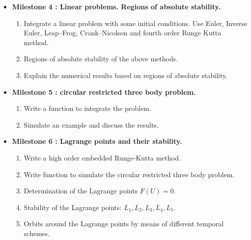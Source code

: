 \documentclass[12pt, a4paper]{article}
\begin{document}
\begin{itemize}
\begin{enumerate}
\end{enumerate} 


\newpage
\item {\bf Milestone 4 : Linear problems. Regions of absolute stability.}  
  \begin{enumerate}
\item  Integrate a linear problem with some initial conditions.  
       Use Euler, Inverse Euler, Leap--Frog, Crank--Nicolson and fourth order Runge Kutta
        method.  
\item Regions of absolute stability of the above methods. 
\item Explain the numerical results based on regions of absolute stability.
\end{enumerate}
 

\item {\bf Milestone 5 : circular restricted three body 
    problem.}    

 \begin{enumerate} 
    
     \item Write a function to integrate the  problem.  
     \item Simulate an example and discuss the results. 
 \end{enumerate}



\item {\bf Milestone 6 : Lagrange points and their stability. }                                                      




\begin{enumerate}
\item Write a high order embedded Runge-Kutta method. 
\item Write function to simulate  the  circular restricted three body 
problem.
\item Determination of the Lagrange points $ F(U) = 0$. 
\item Stability of the Lagrange points: $ L_1, L_2 ,L_3,  L_4, L_5 $.
\item Orbits around the Lagrange points by means of different temporal schemes.

 \end{enumerate}
 
 


\end{itemize}
\end{document}
